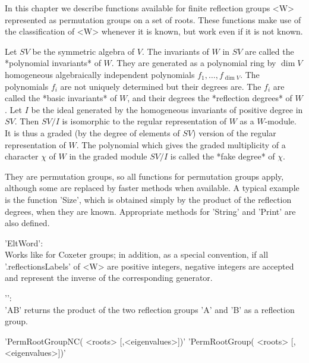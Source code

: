 In  this  chapter  we  describe  functions  available for finite reflection
groups  <W>  represented  as  permutation  groups  on a set of roots. These
functions  make use of the classification of  <W> whenever it is known, but
work even if it is not known.

Let $SV$ be the symmetric algebra of $V$. The invariants of $W$ in $SV$ are
called  the  *polynomial  invariants*  of  $W$.  They  are  generated  as a
polynomial   ring  by   $\dim  V$   homogeneous  algebraically  independent
polynomials $f_1,\ldots,f_{\dim V}$. The polynomials $f_i$ are not uniquely
determined  but  their  degrees  are.  The  $f_i$  are  called  the  *basic
invariants*  of $W$, and their degrees the *reflection degrees* of $W$. Let
$I$ be the ideal generated by the homogeneous invariants of positive degree
in  $SV$. Then $SV/I$ is isomorphic to the regular representation of $W$ as
a  $W$-module. It  is thus  a graded  (by the  degree of  elements of $SV$)
version  of the regular  representation of $W$.  The polynomial which gives
the  graded multiplicity of a character $\chi$  of $W$ in the graded module
$SV/I$ is called the *fake degree* of $\chi$.



They are permutation groups, so all functions for permutation groups apply,
although  some are  replaced by  faster methods  when available.  A typical
example  is the function 'Size', which is obtained simply by the product of
the  reflection  degrees,  when  they  are  known.  Appropriate methods for
'String' and 'Print' are also defined.

'EltWord':\\  Works  like  for  Coxeter  groups;  in addition, as a special
convention,  if  all  '.reflectionsLabels'  of  <W>  are positive integers,
negative   integers  are  accepted   and  represent  the   inverse  of  the
corresponding generator.

'\*':\\  'A\*B' returns the product of the two reflection groups 'A' and 'B'
 as a reflection group.


'PermRootGroupNC( <roots> [,<eigenvalues>])'
'PermRootGroup( <roots> [,<eigenvalues>])'

